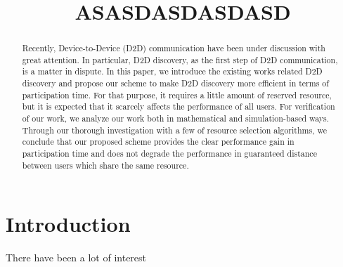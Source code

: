\documentclass[conference]{IEEEtran}
\begin{document}
%
\title{ASASDASDASDASD}


\author{
}


\maketitle


\begin{abstract}
Recently, Device-to-Device (D2D) communication have been under discussion with great attention. In particular, D2D discovery, as the first step of D2D communication, is a matter in dispute. In this paper, we introduce the existing works related D2D discovery and propose our scheme to make D2D discovery more efficient in terms of participation time. For that purpose, it requires a little amount of reserved resource, but it is expected that it scarcely affects the performance of all users.
For verification of our work, we analyze our work both in mathematical and simulation-based ways. Through our thorough investigation with a few of resource selection algorithms, we conclude that our proposed scheme provides the clear performance gain in participation time and does not degrade the performance in guaranteed distance between users which share the same resource.

\end{abstract}



\IEEEpeerreviewmaketitle



\section{Introduction}
There have been a lot of interest 
\end{document}
